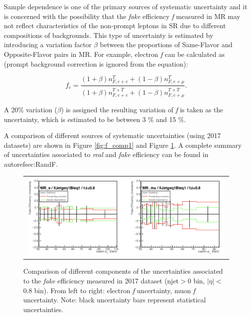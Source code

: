 Sample dependence is one of the primary sources of systematic uncertainty and it is concerned with the possibility that the \emph{fake} efficiency \emph{f} measured in MR may not reflect characteristics of the non-prompt leptons in SR due to different compositions of backgrounds. This type of uncertainty is estimated by introducing a variation factor $\beta$ between the proportions of Same-Flavor and Opposite-Flavor pairs in MR. For example, electron \emph{f} can be calculated as (prompt background correction is ignored from the equation): 

\begin{equation}
f_{e}=\frac{(1+\beta)n_{F,e+e}^{T}+(1-\beta)n_{F,e+\mu}^{T}}{(1+\beta)n_{F,e+e}^{T+\overline{T}}+(1-\beta)n_{F,e+\mu}^{T+\overline{T}}}.
 \label{eq:samp_dep}
\end{equation}

A 20$\%$ variation ($\beta$) is assigned the resulting variation of \emph{f} is taken as the uncertainty, which is estimated to be between 3 $\%$ and 15 $\%$. 
 
A comparison of different sources of systematic uncertainties (using 2017 datasets) are shown in Figure \ref{fig:f_comp1} and Figure \ref{fig:f_comp2}. A complete summary of uncertainties associated to \emph{real} and \emph{fake} efficiency can be found in autoref{sec:RandF}.

\begin{figure}[tbh!]
 \begin{center}
 \begin{tabular}{c}
 \includegraphics[width=0.99\textwidth]{figures/Part3/Systematics/MR2}
 \end{tabular}
 \caption{Comparison of different components of the uncertainties associated to the \emph{fake} efficiency measured in 2017 dataset (njet$>$0 bin, $|\eta|<$0.8 bin). From left to right: electron \emph{f} uncertainty, muon \emph{f} uncertainty. Note: black uncertainty bars represent statistical uncertainties.}
 \label{fig:f_comp2}
 \end{center}
\end{figure}

